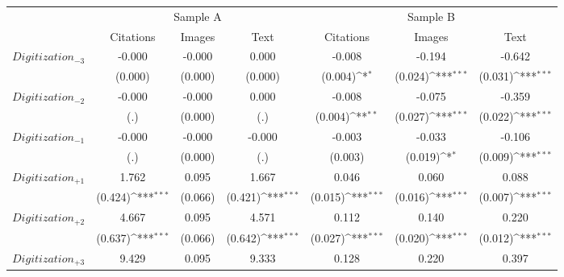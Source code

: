 {
\def\sym#1{\ifmmode^{#1}\else\(^{#1}\)\fi}
\begin{tabular*}{\hsize}{@{\hskip\tabcolsep\extracolsep\fill}l*{6}{c}}
\toprule
            &\multicolumn{3}{c}{Sample A}                                     &\multicolumn{3}{c}{Sample B}                                     \\\cmidrule(lr){2-4}\cmidrule(lr){5-7}
            &\multicolumn{1}{c}{Citations}&\multicolumn{1}{c}{Images}&\multicolumn{1}{c}{Text}&\multicolumn{1}{c}{Citations}&\multicolumn{1}{c}{Images}&\multicolumn{1}{c}{Text}\\
\midrule
$Digitization_{-3}$&      -0.000         &      -0.000         &       0.000         &      -0.008         &      -0.194         &      -0.642         \\
            &     (0.000)         &     (0.000)         &     (0.000)         &     (0.004)\sym{*}  &     (0.024)\sym{***}&     (0.031)\sym{***}\\
\addlinespace
$Digitization_{-2}$&      -0.000         &      -0.000         &       0.000         &      -0.008         &      -0.075         &      -0.359         \\
            &         (.)         &     (0.000)         &         (.)         &     (0.004)\sym{**} &     (0.027)\sym{***}&     (0.022)\sym{***}\\
\addlinespace
$Digitization_{-1}$&      -0.000         &      -0.000         &      -0.000         &      -0.003         &      -0.033         &      -0.106         \\
            &         (.)         &     (0.000)         &         (.)         &     (0.003)         &     (0.019)\sym{*}  &     (0.009)\sym{***}\\
\addlinespace
$Digitization_{+1}$&       1.762         &       0.095         &       1.667         &       0.046         &       0.060         &       0.088         \\
            &     (0.424)\sym{***}&     (0.066)         &     (0.421)\sym{***}&     (0.015)\sym{***}&     (0.016)\sym{***}&     (0.007)\sym{***}\\
\addlinespace
$Digitization_{+2}$&       4.667         &       0.095         &       4.571         &       0.112         &       0.140         &       0.220         \\
            &     (0.637)\sym{***}&     (0.066)         &     (0.642)\sym{***}&     (0.027)\sym{***}&     (0.020)\sym{***}&     (0.012)\sym{***}\\
\addlinespace
$Digitization_{+3}$&       9.429         &       0.095         &       9.333         &       0.128         &       0.220         &       0.397         \\

\end{tabular*}}
